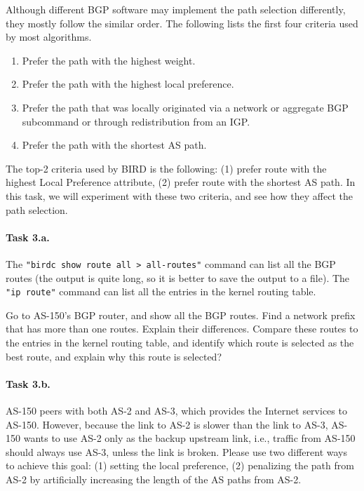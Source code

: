 Although different BGP software may implement the path selection
differently, they mostly follow the similar order. The following
lists the first four criteria used by most algorithms.

\begin{enumerate}[noitemsep]
  \item Prefer the path with the highest weight. 
  \item Prefer the path with the highest local preference.
  \item Prefer the path that was locally originated via a network or 
        aggregate BGP subcommand or through redistribution from an IGP.
  \item Prefer the path with the shortest AS path. 
\end{enumerate}

The top-2 criteria used by BIRD is the following:
(1) prefer route with the highest Local Preference attribute,
(2) prefer route with the shortest AS path. In this task, we will
experiment with these two criteria, and see how they affect 
the path selection. 


\paragraph{Task 3.a.} The \texttt{"birdc show route all > all-routes"} command
can list all the BGP routes (the output is quite long, so it is better to
save the output to a file). The \texttt{"ip route"} command
can list all the entries in the kernel routing table. 

Go to AS-150's BGP router, and show all the BGP routes. Find a network prefix
that has more than one routes. Explain their differences. Compare these 
routes to the entries in the kernel routing table, and identify which route is 
selected as the best route, and explain why this route is selected? 


\paragraph{Task 3.b.}
AS-150 peers with both AS-2 and AS-3, which provides the 
Internet services to AS-150.
However, because the link to AS-2 is slower than
the link to AS-3, AS-150 wants 
to use AS-2 only as the backup upstream link, i.e., traffic
from AS-150 should always use AS-3, unless the link is broken.
Please use two different ways to achieve this goal: 
(1) setting the local preference, 
(2) penalizing the path from AS-2 by artificially
increasing the length of the AS paths from AS-2.


